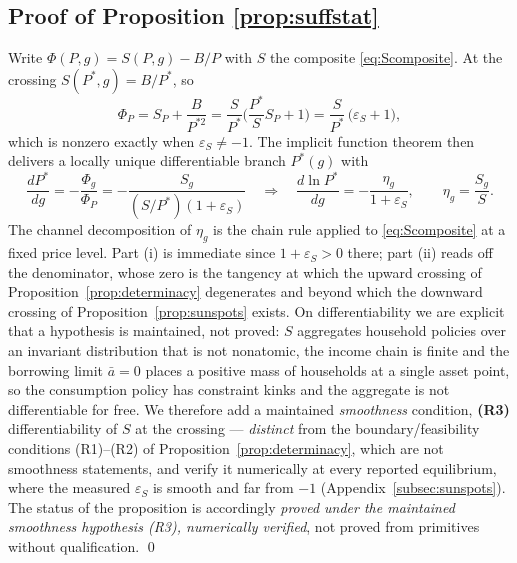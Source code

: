 \documentclass[12pt]{article}
\newcommand{\Sfun}{S}
\begin{document}
\subsection{Proof of Proposition \ref{prop:suffstat}}
Write $\Phi(P,g)=\Sfun(P,g)-B/P$ with $\Sfun$ the composite
\eqref{eq:Scomposite}. At the crossing $\Sfun(P^{*},g)=B/P^{*}$, so
\[
\Phi_P
=\Sfun_P+\frac{B}{P^{*2}}
=\frac{\Sfun}{P^{*}}\Big(\frac{P^{*}}{\Sfun}\Sfun_P+1\Big)
=\frac{\Sfun}{P^{*}}\,\big(\varepsilon_S+1\big),
\]
which is nonzero exactly when $\varepsilon_S\neq-1$. The implicit function
theorem then delivers a locally unique differentiable branch $P^{*}(g)$ with
\[
\frac{dP^{*}}{dg}=-\frac{\Phi_g}{\Phi_P}
=-\frac{\Sfun_g}{(\Sfun/P^{*})(1+\varepsilon_S)}
\quad\Longrightarrow\quad
\frac{d\ln P^{*}}{dg}=-\frac{\eta_g}{1+\varepsilon_S},
\qquad \eta_g=\frac{\Sfun_g}{\Sfun}.
\]
The channel decomposition of $\eta_g$ is the chain rule applied to
\eqref{eq:Scomposite} at a fixed price level. Part (i) is immediate since
$1+\varepsilon_S>0$ there; part (ii) reads off the denominator, whose zero is
the tangency at which the upward crossing of
Proposition~\ref{prop:determinacy} degenerates and beyond which the downward
crossing of Proposition~\ref{prop:sunspots} exists. On differentiability we
are explicit that a hypothesis is maintained, not proved: $\Sfun$ aggregates
household policies over an invariant distribution that is not
nonatomic, the income chain is finite and the borrowing limit $\bar a=0$
places a positive mass of households at a single asset point, so the
consumption policy has constraint kinks and the aggregate is not
differentiable for free. We therefore add a maintained \emph{smoothness}
condition, \textbf{(R3)} differentiability of $\Sfun$ at the crossing ---
\emph{distinct} from the boundary/feasibility conditions (R1)--(R2) of
Proposition~\ref{prop:determinacy}, which are not smoothness statements, and verify it numerically at every reported equilibrium, where the measured
$\varepsilon_S$ is smooth and far from $-1$
(Appendix~\ref{subsec:sunspots}). The status of the proposition is accordingly
\emph{proved under the maintained smoothness hypothesis (R3), numerically
verified}, not proved from primitives without qualification. \qed
\end{document}
